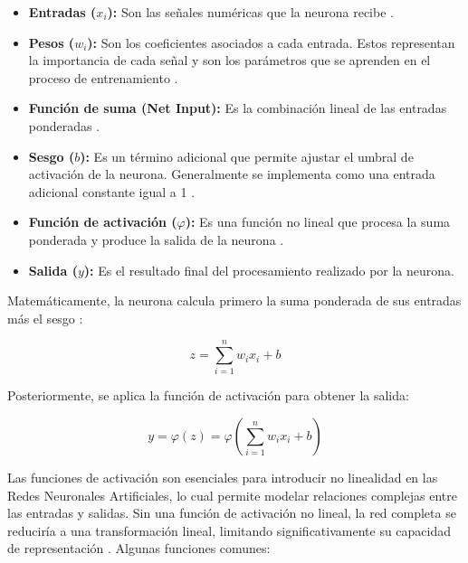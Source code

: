 	\begin{itemize}
		\item \textbf{Entradas ($x_i$):} Son las señales numéricas que la neurona recibe \cite{zupan1994}.
		
		\item \textbf{Pesos ($w_i$):} Son los coeficientes asociados a cada entrada. Estos representan la importancia de cada señal y son los parámetros que se aprenden en el proceso de entrenamiento \cite{zupan1994}.
		
		\item \textbf{Función de suma (Net Input):} Es la combinación lineal de las entradas ponderadas \cite{zupan1994}.
		
		\item \textbf{Sesgo ($b$):} Es un término adicional que permite ajustar el umbral de activación de la neurona. Generalmente se implementa como una entrada adicional constante igual a 1 \cite{zupan1994}.
		
		\item \textbf{Función de activación ($\varphi$):} Es una función no lineal que procesa la suma ponderada y produce la salida de la neurona \cite{zupan1994}.
		
		\item \textbf{Salida ($y$):} Es el resultado final del procesamiento realizado por la neurona.
	\end{itemize}
	
	Matemáticamente, la neurona calcula primero la suma ponderada de sus entradas más el sesgo \cite{nandy2018}:
	
	\begin{equation}
		z = \sum_{i=1}^{n} w_i x_i + b
	\end{equation}
	
	Posteriormente, se aplica la función de activación para obtener la salida:
	
	\begin{equation}
		y = \varphi(z) = \varphi\left( \sum_{i=1}^{n} w_i x_i + b \right)
	\end{equation}
	
	Las funciones de activación son esenciales para introducir no linealidad en las Redes Neuronales Artificiales, lo cual permite modelar relaciones complejas entre las entradas y salidas. Sin una función de activación no lineal, la red completa se reduciría a una transformación lineal, limitando significativamente su capacidad de representación \cite{goodfellow2016dl}. Algunas funciones comunes:
	

